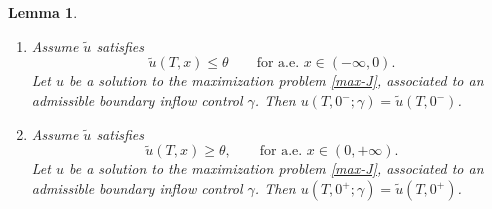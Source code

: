 \documentclass[a4paper, 10pt, final]{article}
\newtheorem{lemma}{Lemma}[section]
\begin{document}
\begin{lemma}
  \label{lemmamon} %
  \begin{enumerate}
    \item Assume $\widetilde u$ satisfies
    \begin{equation*}
      \widetilde u(T,x)\leq \theta\qquad \text{for a.e.  } x\in (-\infty, 0).
    \end{equation*}  
    Let    $u$ be a solution to the maximization problem \eqref{max-J}, associated to an admissible  
    boundary inflow control $\gamma$. Then $u(T, 0^-; \gamma)=\widetilde u(T, 0^-)$. 
 
   

    \item Assume $\widetilde u$ satisfies
    \begin{equation*}
      \widetilde u(T,x)\geq \theta,\qquad \text{for a.e.  } x\in (0, +\infty).
    \end{equation*} 
      Let    $u$ be a solution to the maximization problem \eqref{max-J}, associated to an admissible  boundary 
      inflow control $\gamma$. Then $u(T, 0^+; \gamma)=\widetilde u(T, 0^+)$.  
\end{enumerate}
 
\end{lemma} 
\end{document}

